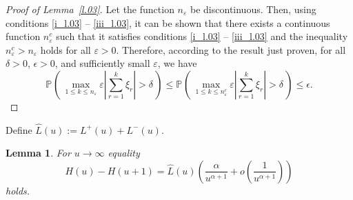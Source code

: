 \documentclass{article}
\theoremstyle{plain}
\newtheorem{lemma}[theorem]{Lemma}
\theoremstyle{definition}
\theoremstyle{remark}
\newcommand{\p}[2][]{{\mathbb{P}}_{#1} \left( \, #2 \, \right) } %
\begin{document}
\begin{proof}[Proof of Lemma~\ref{l.03}]
Let the function $n_{\varepsilon}$ be discontinuous. Then, using conditions \ref{i_l.03} -- \ref{iii_l.03}, it can be shown that there exists a continuous function $n_{\varepsilon}^{c}$ such that it satisfies conditions \ref{i_l.03} -- \ref{iii_l.03} and the inequality $n_{\varepsilon}^{c} > n_{\varepsilon}$ holds for all $\varepsilon > 0$. Therefore, according to the result just proven, for all $\delta > 0$, $\epsilon > 0$, and sufficiently small $\varepsilon$, we have
$$
\p{\max\limits_{1\leqslant k \leqslant n_\varepsilon}\varepsilon\left|\sum\limits_{r=1}^{k}\xi_r\right|>\delta} \leqslant \p{\max\limits_{1\leqslant k \leqslant n_\varepsilon^{c}}\varepsilon\left|\sum\limits_{r=1}^{k}\xi_r\right|>\delta}
\leqslant \epsilon.
$$
\end{proof} 

Define $\widehat{L}(u):=L^+(u)+L^-(u).$
\begin{lemma} \label{l.a1} For $u\rightarrow\infty$ equality
$$
H(u)-H(u+1)=\widehat{L}(u)\left(\frac{\alpha}{u^{\alpha+1}}+o\left(\frac{1}{u^{\alpha+1}}\right)\right)
$$
holds.
\end{lemma}
\end{document}

